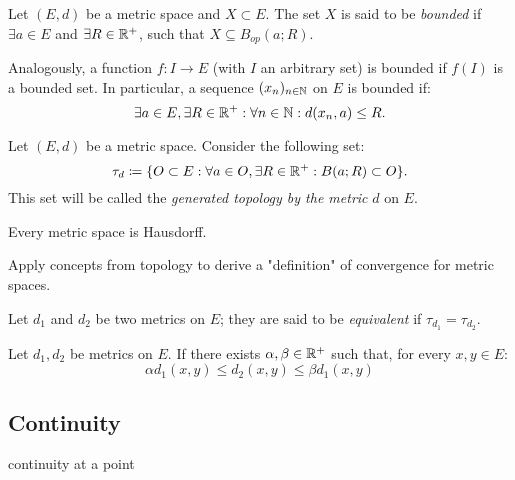 \begin{definition}
	Let $(E, d)$ be a metric space and $X \subset E$. The set $X$ is said to be \emph{bounded} if $\exists a \in E$ and $\exists R \in \mathbb{R}^+$, such that $X \subseteq B_{op}(a;R)$. \par
	Analogously, a function $f : I \to E$ (with $I$ an arbitrary set) is bounded if $f(I)$ is a bounded set. In particular, a sequence $(x_n)_{n \in \mathbb{N}}$ on $E$ is bounded if:
	\begin{equation*}
		\exists a \in E, \exists R \in \mathbb{R}^+ : \forall n \in \mathbb{N} : d(x_n, a) \leq R .
	\end{equation*}
\end{definition}


\begin{definition}
	Let $(E,d)$ be a metric space. Consider the following set:
	\begin{equation*}
		\tau_d \coloneqq \{O \subset E : \forall a \in O, \exists R \in \mathbb{R}^+ : B(a;R) \subset O \}.
	\end{equation*}
	This set will be called the \emph{generated topology by the metric} $d$ on $E$.
\end{definition}

\begin{theorem}
	Every metric space is Hausdorff.	
\end{theorem}

Apply concepts from topology to derive a "definition" of convergence for metric spaces.

\begin{definition}
	Let $d_1$ and $d_2$ be two metrics on $E$; they are said to be \emph{equivalent} if $\tau_{d_1} = \tau_{d_2}$.
\end{definition}

\begin{proposition}
	Let $d_1, d_2$ be metrics on $E$.
	If there exists $\alpha, \beta \in \mathbb{R}^+$ such that, for every $x,y\in E$:
	\begin{equation*}
		\alpha d_1(x,y) \leq d_2(x,y) \leq \beta d_1(x,y)	
	\end{equation*}
\end{proposition}
\subsection{Continuity}
\begin{definition}
continuity at a point	
\end{definition}

